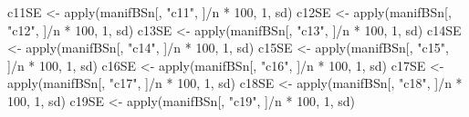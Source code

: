 \documentclass[
]{book}
\newenvironment{Shaded}{\begin{snugshade}}{\end{snugshade}}
\newcommand{\DecValTok}[1]{\textcolor[rgb]{0.00,0.00,0.81}{#1}}
\newcommand{\FunctionTok}[1]{\textcolor[rgb]{0.00,0.00,0.00}{#1}}
\newcommand{\NormalTok}[1]{#1}
\newcommand{\OtherTok}[1]{\textcolor[rgb]{0.56,0.35,0.01}{#1}}
\newcommand{\SpecialCharTok}[1]{\textcolor[rgb]{0.00,0.00,0.00}{#1}}
\newcommand{\StringTok}[1]{\textcolor[rgb]{0.31,0.60,0.02}{#1}}
\begin{document}
\begin{Shaded}
\begin{Highlighting}[]
\NormalTok{c11SE }\OtherTok{\textless{}{-}} \FunctionTok{apply}\NormalTok{(manifBSn[, }\StringTok{"c11"}\NormalTok{, ]}\SpecialCharTok{/}\NormalTok{n }\SpecialCharTok{*} \DecValTok{100}\NormalTok{, }\DecValTok{1}\NormalTok{, sd)}
\NormalTok{c12SE }\OtherTok{\textless{}{-}} \FunctionTok{apply}\NormalTok{(manifBSn[, }\StringTok{"c12"}\NormalTok{, ]}\SpecialCharTok{/}\NormalTok{n }\SpecialCharTok{*} \DecValTok{100}\NormalTok{, }\DecValTok{1}\NormalTok{, sd)}
\NormalTok{c13SE }\OtherTok{\textless{}{-}} \FunctionTok{apply}\NormalTok{(manifBSn[, }\StringTok{"c13"}\NormalTok{, ]}\SpecialCharTok{/}\NormalTok{n }\SpecialCharTok{*} \DecValTok{100}\NormalTok{, }\DecValTok{1}\NormalTok{, sd)}
\NormalTok{c14SE }\OtherTok{\textless{}{-}} \FunctionTok{apply}\NormalTok{(manifBSn[, }\StringTok{"c14"}\NormalTok{, ]}\SpecialCharTok{/}\NormalTok{n }\SpecialCharTok{*} \DecValTok{100}\NormalTok{, }\DecValTok{1}\NormalTok{, sd)}
\NormalTok{c15SE }\OtherTok{\textless{}{-}} \FunctionTok{apply}\NormalTok{(manifBSn[, }\StringTok{"c15"}\NormalTok{, ]}\SpecialCharTok{/}\NormalTok{n }\SpecialCharTok{*} \DecValTok{100}\NormalTok{, }\DecValTok{1}\NormalTok{, sd)}
\NormalTok{c16SE }\OtherTok{\textless{}{-}} \FunctionTok{apply}\NormalTok{(manifBSn[, }\StringTok{"c16"}\NormalTok{, ]}\SpecialCharTok{/}\NormalTok{n }\SpecialCharTok{*} \DecValTok{100}\NormalTok{, }\DecValTok{1}\NormalTok{, sd)}
\NormalTok{c17SE }\OtherTok{\textless{}{-}} \FunctionTok{apply}\NormalTok{(manifBSn[, }\StringTok{"c17"}\NormalTok{, ]}\SpecialCharTok{/}\NormalTok{n }\SpecialCharTok{*} \DecValTok{100}\NormalTok{, }\DecValTok{1}\NormalTok{, sd)}
\NormalTok{c18SE }\OtherTok{\textless{}{-}} \FunctionTok{apply}\NormalTok{(manifBSn[, }\StringTok{"c18"}\NormalTok{, ]}\SpecialCharTok{/}\NormalTok{n }\SpecialCharTok{*} \DecValTok{100}\NormalTok{, }\DecValTok{1}\NormalTok{, sd)}
\NormalTok{c19SE }\OtherTok{\textless{}{-}} \FunctionTok{apply}\NormalTok{(manifBSn[, }\StringTok{"c19"}\NormalTok{, ]}\SpecialCharTok{/}\NormalTok{n }\SpecialCharTok{*} \DecValTok{100}\NormalTok{, }\DecValTok{1}\NormalTok{, sd)}


\end{Highlighting}
\end{Shaded}
\end{document}
